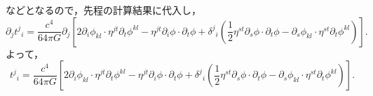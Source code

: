 \documentclass[a4paper]{ltjsreport}
\begin{document}
などとなるので，先程の計算結果に代入し，
\[
\partial_j{t^j}_i = \frac{c^4}{64\pi{G}}\partial_j
\left[2\partial_i\phi_{kl}\cdot{}\eta^{jt}\partial_t\phi^{kl} - \eta^{jt}\partial_i\phi\cdot\partial_t\phi
+ {\delta^j}_i\left(\frac{1}{2}\eta^{st}\partial_s\phi\cdot\partial_t\phi - \partial_s\phi_{kl}\cdot{}\eta^{st}\partial_t\phi^{kl}\right)\right] .
\]
よって，
\[ {t^j}_i=\frac{c^4}{64\pi{G}}
\left[2\partial_i\phi_{kl}\cdot{}\eta^{jt}\partial_t\phi^{kl} - \eta^{jt}\partial_i\phi\cdot\partial_t\phi
+ {\delta^j}_i\left(\frac{1}{2}\eta^{st}\partial_s\phi\cdot\partial_t\phi - \partial_s\phi_{kl}\cdot{}\eta^{st}\partial_t\phi^{kl}\right)\right] .
\]
\end{document}

